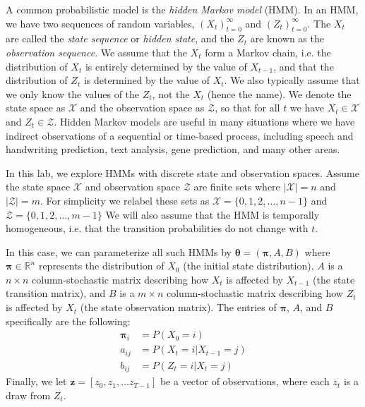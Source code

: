 \label{lab:hmm}
\labdependencies{}

A common probabilistic model is the \emph{hidden Markov model} (HMM).
In an HMM, we have two sequences of random variables, $(X_t)_{t=0}^\infty$ and $(Z_t)_{t=0}^\infty$.
The $X_t$ are called the \emph{state sequence} or \emph{hidden state}, and the $Z_t$ are known as the \emph{observation sequence}.
We assume that the $X_t$ form a Markov chain, i.e. the distribution of $X_t$ is entirely determined by the value of $X_{t-1}$, and that the distribution of $Z_t$ is determined by the value of $X_t$.
We also typically assume that we only know the values of the $Z_t$, not the $X_t$ (hence the name).
We denote the state space as $\mathscr{X}$ and the observation space as $\mathscr{Z}$, so that for all $t$ we have $X_t\in \mathscr{X}$ and $Z_t\in \mathscr{Z}$.
Hidden Markov models are useful in many situations where we have indirect observations of a sequential or time-based process, including speech and handwriting prediction, text analysis, gene prediction, and many other areas.

In this lab, we explore HMMs with discrete state and observation spaces.
Assume the state space $\mathscr{X}$ and observation space $\mathscr{Z}$ are finite sets where $\vert \mathscr{X}\vert = n$ and $\vert \mathscr{Z} \vert = m$.
For simplicity we relabel these sets as $\mathscr{X}=\{0,1,2,\ldots,n-1\}$ and $\mathscr{Z}=\{0,1,2,\ldots,m-1\}$
We will also assume that the HMM is temporally homogeneous, i.e. that the transition probabilities do not change with $t$.

In this case, we can parameterize all such HMMs by $\boldsymbol\theta = (\boldsymbol\pi, A, B)$ where $\boldsymbol\pi\in\mathbb{R}^n$ represents the distribution of $X_0$ (the initial state distribution), $A$ is a $n \times n$
column-stochastic matrix describing how $X_t$ is affected by $X_{t-1}$ (the state transition matrix), and $B$ is a $m \times n$ column-stochastic matrix describing how $Z_t$ is affected by $X_t$ (the state observation matrix).
The entries of $\boldsymbol\pi$, $A$, and $B$ specifically are the following:
\begin{align*}
\boldsymbol\pi_i &=P(X_0=i) \\
a_{ij} &= P(X_t=i | X_{t-1}=j)
\\
b_{ij} &= P(Z_t=i | X_t=j)
\end{align*}
Finally, we let $\boldsymbol z=[z_0 ,z_1,\ldots z_{T-1}]$ be a vector of observations, where each $z_t$ is a draw from $Z_t$.

